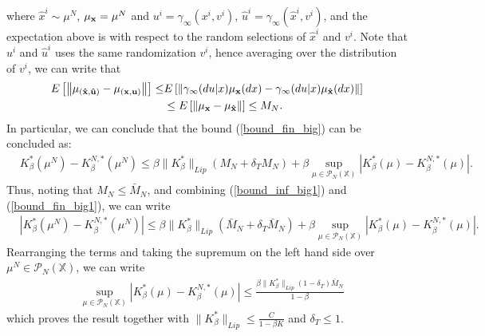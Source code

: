 \documentclass[twoside,11pt]{article}
\def\P{{\mathcal P}}
\begin{document}
where $\hat{x}^i \sim \mu^N$, $\mu_{\bf x}=\mu^N$ and $u^i=\gamma_\infty(x^i,v^i)$, $\hat{u}^i = \gamma_\infty(\hat{x}^i,v^i)$, and the expectation above is with respect to the random selections of $\hat{x}^i$ and $v^i$. Note that $u^i$ and $\hat{u}^i$ uses the same randomization $v^i$, hence averaging over the distribution of $v^i$, we can write that
\begin{align*}
 E\left[\left\|\mu_{\bf (\hat{x},\hat{u})} - \mu_{(\bf x,u)}\right\| \right]  \leq& E \left[ \left\| \gamma_\infty(du|x)\mu_{\bf x}(dx) - \gamma_\infty(du|x)\mu_{\bf \hat{x}}(dx)\right\|\right]\\
&\leq E \left[  \|\mu_{\bf x} - \mu_{\bf \hat{x}}\| \right] \leq M_N.
\end{align*}
In particular, we can conclude that the bound (\ref{bound_fin_big}) can be concluded as:
\begin{align}\label{bound_fin_big1}
& K_\beta^{*}(\mu^N) - K_\beta^{N,*}(\mu^N)  \leq \beta \|K_\beta^*\|_{Lip}\left( M_N +  \delta_T M_N \right) +  \beta \sup_{\mu\in \P_N(\mathds{X})} \left| K_\beta^*(\mu)-  K_\beta^{N,*}(\mu)\right|.
\end{align}
Thus, noting that $M_N\leq \bar{M}_N$, and combining (\ref{bound_inf_big1}) and (\ref{bound_fin_big1}), we can write
\begin{align*}
& |K_\beta^{*}(\mu^N) - K_\beta^{N,*}(\mu^N) | \leq \beta \|K_\beta^*\|_{Lip}\left( \bar{M}_N +  \delta_T \bar{M}_N \right) +  \beta \sup_{\mu\in \P_N(\mathds{X})} \left| K_\beta^*(\mu)-  K_\beta^{N,*}(\mu)\right|.
\end{align*}
Rearranging the terms and taking the supremum on the left hand side over $\mu^N\in \P_N(\mathds{X})$, we can write
\begin{align*}
&\sup_{\mu\in \P_N(\mathds{X})} |K_\beta^{*}(\mu) - K_\beta^{N,*}(\mu) | \leq \frac{\beta \|K_\beta^*\|_{Lip} (1-\delta_T) \bar{M}_N}{1-\beta}
\end{align*}
which proves the result together with $\|K_\beta^*\|_{Lip}\leq \frac{C}{1-\beta K}$ and $\delta_T\leq1$.





\end{document}
